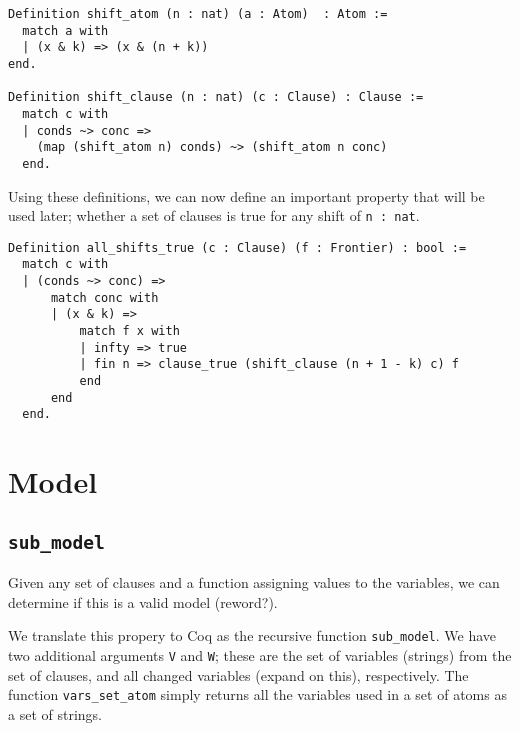 \begin{minipage}{\linewidth}
\begin{lstlisting}[language=Coq, label={lst:shift_atom_clause_true}, caption={Def. of \lstinline{shift_atom} and \lstinline{shift_clause} in Coq}]
Definition shift_atom (n : nat) (a : Atom)  : Atom :=
  match a with
  | (x & k) => (x & (n + k))
end.

Definition shift_clause (n : nat) (c : Clause) : Clause :=
  match c with
  | conds ~> conc =>
    (map (shift_atom n) conds) ~> (shift_atom n conc)
  end.
\end{lstlisting}
\end{minipage}

Using these definitions, we can now define an important property that will be used
later; whether a set of clauses is true for any shift of \lstinline{n : nat}.

\begin{minipage}{\linewidth}
\begin{lstlisting}[language=Coq, label={lst:all_shifts_true}, caption={Def. of \lstinline{all_shifts_true}}]
Definition all_shifts_true (c : Clause) (f : Frontier) : bool :=
  match c with
  | (conds ~> conc) =>
      match conc with
      | (x & k) =>
          match f x with
          | infty => true
          | fin n => clause_true (shift_clause (n + 1 - k) c) f
          end
      end
  end.
\end{lstlisting}
\end{minipage}

\section{Model}

\subsection{\lstinline{sub_model}}

Given any set of clauses and a function assigning values to the variables,
we can determine if this is a valid model (reword?).

We translate this propery to Coq as the recursive function \lstinline{sub_model}.
We have two additional arguments \lstinline{V} and \lstinline{W}; these are
the set of variables (strings) from the set of clauses, and all changed variables (expand on this), respectively.
The function \lstinline{vars_set_atom} simply returns all the variables used
in a set of atoms as a set of strings.

